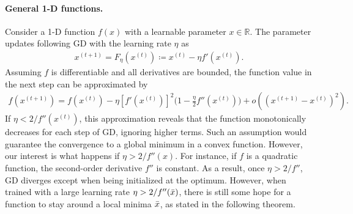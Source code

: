 \documentclass{article}
\theoremstyle{plain}
\theoremstyle{remark}
\def\t{^{(t)}}
\def\tt{^{(t+1)}}
\begin{document}
\paragraph{General 1-D functions.} Consider a 1-D function $f(x)$ with a learnable parameter $x\in\mathbb{R}$. The parameter updates following GD with the learning rate $\eta$ as
\begin{align}
    x\tt = F_\eta(x\t) \coloneqq x\t - \eta f'(x\t).
\end{align}
Assuming $f$ is differentiable and all derivatives are bounded, the function value in the next step can be approximated by
\begin{align*}
    f(x\tt) 
    = f(x\t) - \eta [f'(x\t)]^2\Big(1- \frac{\eta}{2}f''(x\t)\Big)
    + o((x\tt-x\t)^2).&
\end{align*}
If $\eta<2/f''(x\t)$, this approximation reveals that the function monotonically decreases for each step of GD, ignoring higher terms. Such an assumption would guarantee the convergence to a global minimum in a convex function. However, our interest is what happens if $\eta>2/f''(x)$. For instance, if $f$ is a quadratic function, the second-order derivative $f''$ is constant. As a result, once $\eta>2/f''$, GD diverges except when being initialized at the optimum. However, when trained with a large learning rate $\eta>2/f''(\Bar{x})$, there is still some hope for a function to stay around a local minima $\Bar{x}$, as stated in the following theorem.
\end{document}
